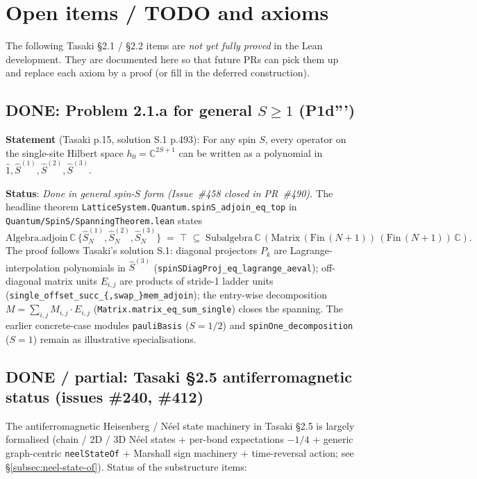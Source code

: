 \documentclass[a4paper,11pt]{article}
\begin{document}
\section{Open items / TODO and axioms}
\label{sec:open-items}

The following Tasaki §2.1 / §2.2 items are \emph{not yet fully proved}
in the Lean development. They are documented here so that future PRs
can pick them up and replace each axiom by a proof (or fill in the
deferred construction).

\subsection*{DONE: Problem 2.1.a for general \texorpdfstring{$S \geq 1$}{S >= 1} (P1d''')}

\textbf{Statement} (Tasaki p.15, solution S.1 p.493): For any spin $S$,
every operator on the single-site Hilbert space $h_0 = \mathbb{C}^{2S+1}$
can be written as a polynomial in $\hat 1, \hat S^{(1)}, \hat S^{(2)},
\hat S^{(3)}$.

\textbf{Status}: \emph{Done in general spin-$S$ form (Issue~\#458 closed
in PR~\#490).} The headline theorem
\texttt{LatticeSystem.Quantum.spinS\_adjoin\_eq\_top}
in
\texttt{Quantum/SpinS/SpanningTheorem.lean} states
\[
  \mathrm{Algebra.adjoin}\,\mathbb{C}\,\{\hat S^{(1)}_N, \hat S^{(2)}_N,
    \hat S^{(3)}_N\}
  \;=\; \top
  \;\subseteq\; \mathrm{Subalgebra}\,\mathbb{C}\,
    (\mathrm{Matrix}\,(\mathrm{Fin}\,(N+1))\,(\mathrm{Fin}\,(N+1))\,\mathbb{C}).
\]
The proof follows Tasaki's solution S.1: diagonal projectors $P_k$
are Lagrange-interpolation polynomials in $\hat S^{(3)}$
(\texttt{spinSDiagProj\_eq\_lagrange\_aeval}); off-diagonal matrix
units $E_{i,j}$ are products of stride-1 ladder units
(\texttt{single\_offset\_succ\_\{,swap\_\}mem\_adjoin}); the
entry-wise decomposition $M = \sum_{i,j} M_{i,j} \cdot E_{i,j}$
(\texttt{Matrix.matrix\_eq\_sum\_single}) closes the spanning. The
earlier concrete-case modules \texttt{pauliBasis} ($S = 1/2$) and
\texttt{spinOne\_decomposition} ($S = 1$) remain as illustrative
specialisations.

\subsection*{DONE / partial: Tasaki §2.5 antiferromagnetic status (issues \#240, \#412)}

The antiferromagnetic Heisenberg / Néel state machinery in Tasaki
§2.5 is largely formalised (chain / 2D / 3D Néel states + per-bond
expectations $-1/4$ + generic graph-centric \texttt{neelStateOf} +
Marshall sign machinery + time-reversal action; see
§\ref{subsec:neel-state-of}). Status of the substructure items:
\end{document}
